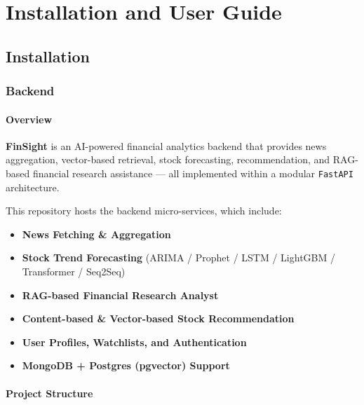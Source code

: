 \chapter{Installation and User Guide}

\section{Installation}

\subsection{Backend}

\subsubsection{Overview}

\textbf{FinSight} is an AI-powered financial analytics backend that provides news aggregation, vector-based retrieval, stock forecasting, recommendation, and RAG-based financial research assistance — all implemented within a modular \texttt{FastAPI} architecture.

This repository hosts the backend micro-services, which include:

\begin{itemize}
    \item \textbf{News Fetching \& Aggregation}
    \item \textbf{Stock Trend Forecasting} (ARIMA / Prophet / LSTM / LightGBM / Transformer / Seq2Seq)
    \item \textbf{RAG-based Financial Research Analyst}
    \item \textbf{Content-based \& Vector-based Stock Recommendation}
    \item \textbf{User Profiles, Watchlists, and Authentication}
    \item \textbf{MongoDB + Postgres (pgvector) Support}
\end{itemize}

\subsubsection{Project Structure}

